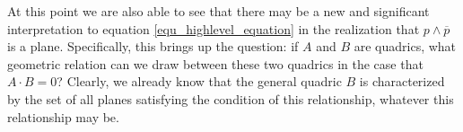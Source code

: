 \documentclass{ecgd-l}
\theoremstyle{definition}
\theoremstyle{remark}
\numberwithin{equation}{section}
\begin{document}
At this point we are also able to see that there may be a new
and significant interpretation to equation \eqref{equ_highlevel_equation}
in the realization that $p\wedge\overline{p}$ is a plane.  Specifically,
this brings up the question: if $A$ and $B$ are quadrics, what geometric
relation can we draw between these two quadrics in the case that
$A\cdot B=0$?  Clearly, we already know that the general
quadric $B$ is characterized by the set of all planes satisfying
the condition of this relationship, whatever this relationship may be.





\end{document}
